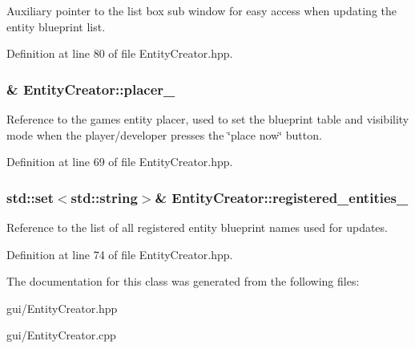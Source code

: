Auxiliary pointer to the list box sub window for easy access when updating the entity blueprint list. 



Definition at line 80 of file Entity\+Creator.\+hpp.

\subsubsection[{\texorpdfstring{placer\+\_\+}{placer_}}]{\& Entity\+Creator\+::placer\+\_\+\hspace{0.3cm}{\ttfamily [private]}}\hypertarget{class_entity_creator_a9391bd0312fc88528dbb7533a835daaf}{}\label{class_entity_creator_a9391bd0312fc88528dbb7533a835daaf}


Reference to the game\textquotesingle{}s entity placer, used to set the blueprint table and visibility mode when the player/developer presses the \char`\"{}place now\char`\"{} button. 



Definition at line 69 of file Entity\+Creator.\+hpp.

\subsubsection[{\texorpdfstring{registered\+\_\+entities\+\_\+}{registered_entities_}}]{\setlength{\rightskip}{0pt plus 5cm}std\+::set$<$std\+::string$>$\& Entity\+Creator\+::registered\+\_\+entities\+\_\+\hspace{0.3cm}{\ttfamily [private]}}\hypertarget{class_entity_creator_a15d7d05f00f1fadb0bbba6170b98c2e1}{}\label{class_entity_creator_a15d7d05f00f1fadb0bbba6170b98c2e1}


Reference to the list of all registered entity blueprint names used for updates. 



Definition at line 74 of file Entity\+Creator.\+hpp.



The documentation for this class was generated from the following files\+:\begin{DoxyCompactItemize}
\item 
gui/Entity\+Creator.\+hpp\item 
gui/Entity\+Creator.\+cpp\end{DoxyCompactItemize}
